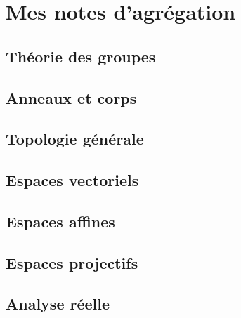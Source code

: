 



\makeindex
\makenomenclature





    

\tableofcontents



\part{Mes notes d'agrégation}

\chapter{Théorie des groupes}


\chapter{Anneaux et corps}


\chapter{Topologie générale}


\chapter{Espaces vectoriels}


\chapter{Espaces affines}


\chapter{Espaces projectifs}


\chapter{Analyse réelle}


